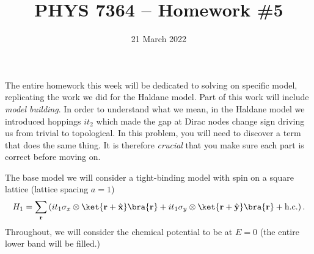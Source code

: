 \documentclass{jhwhw}
\author{}
\title{PHYS 7364 -- Homework \#5}
\date{21 March 2022}
\begin{document}

The entire homework this week will be dedicated to solving on specific model, replicating the work we did for the Haldane model.
Part of this work will include \emph{model building}.
In order to understand what we mean, in the Haldane model we introduced hoppings $i t_{2}$ which made the gap at Dirac nodes change sign driving us from trivial to topological.
In this problem, you will need to discover a term that does the same thing.
It is therefore \emph{crucial} that you make sure each part is correct before moving on.

The base model we will consider a tight-binding model with spin on a square lattice (lattice spacing $a = 1$)
\begin{equation}
  H_{1} = \sum_{\mathbf r} \left(i t_{1} \sigma_{x} \otimes \ket{\mathbf r + \hat{\mathbf x}}\bra{\mathbf r}  + i t_{1} \sigma_{y} \otimes \ket{\mathbf r + \hat{\mathbf y}}\bra{\mathbf r} + \mathrm{h.c.}\right).\label{eq:soc}
\end{equation}
Throughout, we will consider the chemical potential to be at $E=0$ (the entire lower band will be filled.)
\end{document}
